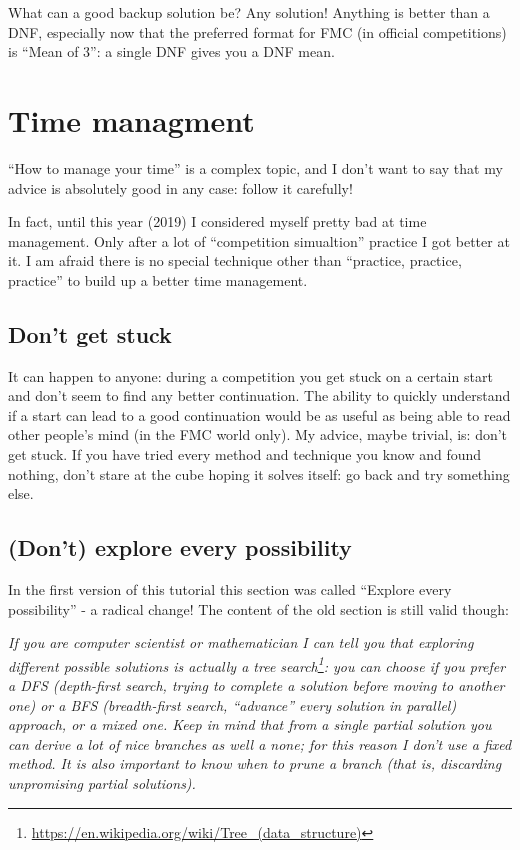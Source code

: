\documentclass[11pt,a4paper]{book}
\begin{document}
What can a good backup solution be? Any solution! Anything is better than a DNF, especially now that the preferred format for FMC (in official competitions) is  ``Mean of 3'': a single DNF gives you a DNF mean.

\section{Time managment}
\label{time-ma}

``How to manage your time'' is a complex topic, and I don't want to say that my advice is absolutely good in any case: follow it carefully!

In fact, until this year (2019) I considered myself pretty bad at time management. Only after a lot of ``competition simualtion'' practice I got better at it. I am afraid there is no special technique other than ``practice, practice, practice'' to build up a better time management.

\subsection{Don't get stuck}

It can happen to anyone: during a competition you get stuck on a certain start and don't seem to find any better continuation. The ability to quickly understand if a start can lead to a good continuation would be as useful as being able to read other people's mind (in the FMC world only). My advice, maybe trivial, is: don't get stuck. If you have tried every method and technique you know and found nothing, don't stare at the cube hoping it solves itself: go back and try something else.

\subsection{(Don't) explore every possibility}

In the first version of this tutorial this section was called ``Explore every possibility'' - a radical change! The content of the old section is still valid though:

\bigskip
\emph{If you are computer scientist or mathematician I can tell you that exploring different possible solutions is actually a tree search\footnote{\url{https://en.wikipedia.org/wiki/Tree_(data_structure)}}: you can choose if you prefer a DFS (depth-first search, trying to complete a solution before moving to another one) or a BFS (breadth-first search, “advance” every solution in parallel) approach, or a mixed one. Keep in mind that from a single partial solution you can derive a lot of nice branches as well a none; for this reason I don't use a fixed method. It is also important to know when to prune a branch (that is, discarding unpromising partial solutions).}
\end{document}
